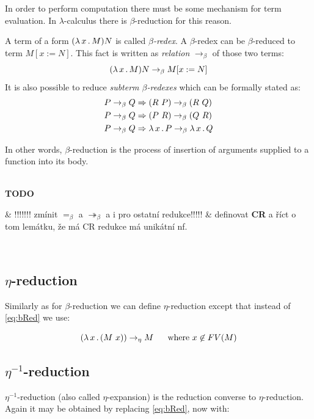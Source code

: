 \documentclass[12pt,a4paper]{report}
\newenvironment{todo}
{ ~\\[0.5em]
  {\color{red}\textbf{TODO}}
  \begin{easylist}[itemize]}
{ \end{easylist}
  ~}
\begin{document}
In order to perform computation there must be some
mechanism for term evaluation. In $\lambda$-calculus there
is $\beta$-reduction for this reason.\\

\newcommand{\bRedex}{$\beta$-redex\xspace}
\newcommand{\bRedexes}{$\beta$-redexes\xspace}
\newcommand{\bArrow}{\rightarrow_\beta\xspace}
\newcommand{\eArrow}{\rightarrow_\eta\xspace}
\newcommand{\eeArrow}{\rightarrow_{\eta^{-1}}\xspace}

A term of a form $( \lambda \, x \, . \, M )N$ is called \textit{\bRedex}.
A \bRedex can be $\beta$-reduced to term $M[x:=N]$. 
This fact is written as \textit{relation} $\bArrow$ 
of those two terms:
\begin{equation} \label{eq:bRed}
\lamb{x}{M}N \bArrow M[x:=N]
\end{equation}
It is also possible to reduce \textit{subterm \bRedexes} 
which can be formally stated as:
\begin{align*}
P \bArrow Q &\then (R~P)      \bArrow (R~Q) \\
P \bArrow Q &\then (P~R)      \bArrow (Q~R) \\
P \bArrow Q &\then \lam{x}{P} \bArrow \lam{x}{Q}  
\end{align*}

In other words, $\beta$-reduction is the process 
of insertion of arguments supplied to a function into 
its body. 

\begin{todo}
& !!!!!!! zmínit $=_\beta$ a $\twoheadrightarrow_\beta$  a i pro ostatní redukce!!!!!
& definovat \textbf{CR} a říct o tom lemátku, že má CR redukce má unikátní nf.
\end{todo}


\subsection{$\eta$-reduction}

Similarly as for $\beta$-reduction we can define $\eta$-reduction 
except that instead of \ref{eq:bRed} we use:  

$$\lamb{x}{(M~x)} \eArrow M \text{ ~~~~where } x \not\in FV(M) $$

\subsection{$\eta^{-1}$-reduction}

$\eta^{-1}$-reduction (also called $\eta$-expansion) is 
the reduction converse to $\eta$-reduction.
Again it may be obtained by replacing \ref{eq:bRed}, now with:  
\end{document}
